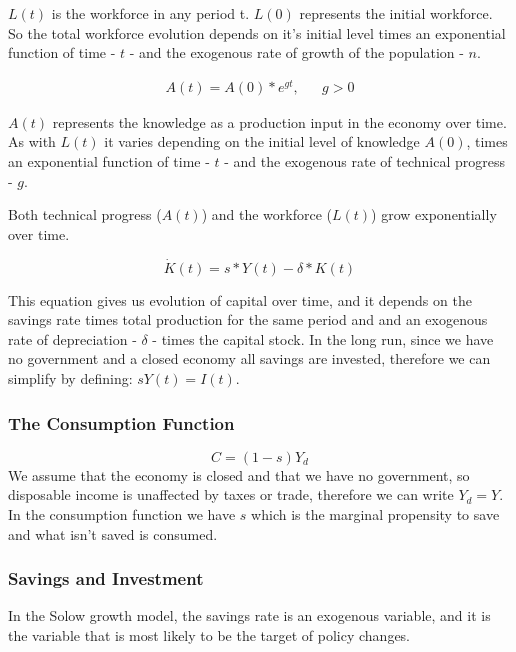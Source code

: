 $L(t)$ is the workforce in any period t. $L(0)$ represents the initial workforce. So the total workforce evolution depends on it's initial level times an exponential function of time - $t$ - and the exogenous rate of growth of the population - $n$.

\begin{align*}
A(t)=A(0)*e^{gt} ,&& g>0
\end{align*}

$A(t)$ represents the knowledge as a production input in the economy over time. As with $L(t)$ it varies depending on the initial level of knowledge $A(0)$, times an exponential function of time - $t$ - and the exogenous rate of technical progress - $g$.

Both technical progress ($A(t)$) and the workforce ($L(t)$) grow exponentially over time. 

\begin{equation*}
    \dot{K}(t)=s*Y(t)-\delta*K(t)
\end{equation*}

This equation gives us evolution of capital over time, and it depends on the savings rate times total production for the same period and and an exogenous rate of depreciation - $\delta$ - times the capital stock. In the long run, since we have no government and a closed economy all savings are invested, therefore we can simplify by defining: $sY(t) = I(t) $.

\subsubsection*{The Consumption Function}
\begin{equation}
C=(1-s)Y_d
\end{equation}
\begin{equation*}
\end{equation*}
We assume that the economy is closed and that we have no government, so disposable income is unaffected by taxes or trade, therefore we can write $Y_d=Y$. In the consumption function we have $s$ which is the marginal propensity to save and what isn't saved is consumed. 

\subsubsection*{Savings and Investment}
In the Solow growth model, the savings rate is an exogenous variable, and it is the variable that is most likely to be the target of policy changes. 

